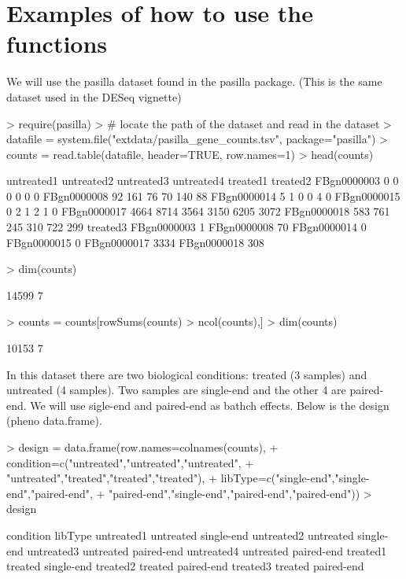 \documentclass{article}
\begin{document}
\section{Examples of how to use the functions}
We will use the pasilla dataset found in the pasilla package. (This is the same dataset used
in the DESeq vignette)
\begin{Schunk}
\begin{Sinput}
> require(pasilla)
> # locate the path of the dataset and read in the dataset
> datafile = system.file("extdata/pasilla_gene_counts.tsv", package="pasilla")
> counts = read.table(datafile, header=TRUE, row.names=1)
> head(counts)
\end{Sinput}
\begin{Soutput}
            untreated1 untreated2 untreated3 untreated4 treated1 treated2
FBgn0000003          0          0          0          0        0        0
FBgn0000008         92        161         76         70      140       88
FBgn0000014          5          1          0          0        4        0
FBgn0000015          0          2          1          2        1        0
FBgn0000017       4664       8714       3564       3150     6205     3072
FBgn0000018        583        761        245        310      722      299
            treated3
FBgn0000003        1
FBgn0000008       70
FBgn0000014        0
FBgn0000015        0
FBgn0000017     3334
FBgn0000018      308
\end{Soutput}
\begin{Sinput}
> dim(counts)
\end{Sinput}
\begin{Soutput}
[1] 14599     7
\end{Soutput}
\begin{Sinput}
> counts = counts[rowSums(counts) > ncol(counts),]
> dim(counts)
\end{Sinput}
\begin{Soutput}
[1] 10153     7
\end{Soutput}
\end{Schunk}
In this dataset there are two biological conditions: treated (3 samples) and untreated (4 samples). 
Two samples are single-end and the other 4 are paired-end. We will use sigle-end and paired-end
as bathch effects. Below is the design (pheno data.frame).
\begin{Schunk}
\begin{Sinput}
> design = data.frame(row.names=colnames(counts), 
+                     condition=c("untreated","untreated","untreated",
+                                 "untreated","treated","treated","treated"),
+                     libType=c("single-end","single-end","paired-end",
+                               "paired-end","single-end","paired-end","paired-end"))
> design
\end{Sinput}
\begin{Soutput}
           condition    libType
untreated1 untreated single-end
untreated2 untreated single-end
untreated3 untreated paired-end
untreated4 untreated paired-end
treated1     treated single-end
treated2     treated paired-end
treated3     treated paired-end
\end{Soutput}
\end{Schunk}
\end{document}
